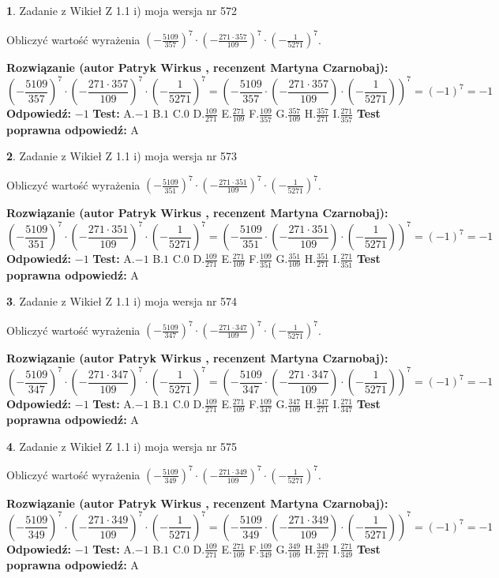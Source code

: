 \documentclass[12pt, a4paper]{article}
\theoremstyle{definition} %
\newtheorem{zad}{}
\newcommand{\zadStart}[1]{\begin{zad}#1\newline}
\newcommand{\zadStop}{\end{zad}}
\newcommand{\rozwStart}[2]{\noindent \textbf{Rozwiązanie (autor #1 , recenzent #2): }\newline}
\newcommand{\rozwStop}{\newline}
\newcommand{\odpStart}{\noindent \textbf{Odpowiedź:}\newline}
\newcommand{\odpStop}{\newline}
\newcommand{\testStart}{\noindent \textbf{Test:}\newline}
\newcommand{\testStop}{\newline}
\newcommand{\kluczStart}{\noindent \textbf{Test poprawna odpowiedź:}\newline}
\newcommand{\kluczStop}{\newline}
\begin{document}
\zadStart{Zadanie z Wikieł Z 1.1 i) moja wersja nr 572}

Obliczyć wartość wyrażenia $(-\frac{5109}{357})^{7} \cdot (-\frac{271 \cdot 357}{109})^{7} \cdot (-\frac{1}{5271})^{7}$.
\zadStop
\rozwStart{Patryk Wirkus}{Martyna Czarnobaj}
$$(-\frac{5109}{357})^{7} \cdot (-\frac{271 \cdot 357}{109})^{7} \cdot (-\frac{1}{5271})^{7} = (-\frac{5109}{357} \cdot (-\frac{271 \cdot 357}{109}) \cdot (-\frac{1}{5271}))^{7} = (-1)^{7} = -1$$
\rozwStop
\odpStart
$-1$
\odpStop
\testStart
A.$-1$ B.$1$ C.$0$ D.$\frac{109}{271}$ E.$\frac{271}{109}$
F.$\frac{109}{357}$ G.$\frac{357}{109}$
H.$\frac{357}{271}$
I.$\frac{271}{357}$
\testStop
\kluczStart
A
\kluczStop



\zadStart{Zadanie z Wikieł Z 1.1 i) moja wersja nr 573}

Obliczyć wartość wyrażenia $(-\frac{5109}{351})^{7} \cdot (-\frac{271 \cdot 351}{109})^{7} \cdot (-\frac{1}{5271})^{7}$.
\zadStop
\rozwStart{Patryk Wirkus}{Martyna Czarnobaj}
$$(-\frac{5109}{351})^{7} \cdot (-\frac{271 \cdot 351}{109})^{7} \cdot (-\frac{1}{5271})^{7} = (-\frac{5109}{351} \cdot (-\frac{271 \cdot 351}{109}) \cdot (-\frac{1}{5271}))^{7} = (-1)^{7} = -1$$
\rozwStop
\odpStart
$-1$
\odpStop
\testStart
A.$-1$ B.$1$ C.$0$ D.$\frac{109}{271}$ E.$\frac{271}{109}$
F.$\frac{109}{351}$ G.$\frac{351}{109}$
H.$\frac{351}{271}$
I.$\frac{271}{351}$
\testStop
\kluczStart
A
\kluczStop



\zadStart{Zadanie z Wikieł Z 1.1 i) moja wersja nr 574}

Obliczyć wartość wyrażenia $(-\frac{5109}{347})^{7} \cdot (-\frac{271 \cdot 347}{109})^{7} \cdot (-\frac{1}{5271})^{7}$.
\zadStop
\rozwStart{Patryk Wirkus}{Martyna Czarnobaj}
$$(-\frac{5109}{347})^{7} \cdot (-\frac{271 \cdot 347}{109})^{7} \cdot (-\frac{1}{5271})^{7} = (-\frac{5109}{347} \cdot (-\frac{271 \cdot 347}{109}) \cdot (-\frac{1}{5271}))^{7} = (-1)^{7} = -1$$
\rozwStop
\odpStart
$-1$
\odpStop
\testStart
A.$-1$ B.$1$ C.$0$ D.$\frac{109}{271}$ E.$\frac{271}{109}$
F.$\frac{109}{347}$ G.$\frac{347}{109}$
H.$\frac{347}{271}$
I.$\frac{271}{347}$
\testStop
\kluczStart
A
\kluczStop



\zadStart{Zadanie z Wikieł Z 1.1 i) moja wersja nr 575}

Obliczyć wartość wyrażenia $(-\frac{5109}{349})^{7} \cdot (-\frac{271 \cdot 349}{109})^{7} \cdot (-\frac{1}{5271})^{7}$.
\zadStop
\rozwStart{Patryk Wirkus}{Martyna Czarnobaj}
$$(-\frac{5109}{349})^{7} \cdot (-\frac{271 \cdot 349}{109})^{7} \cdot (-\frac{1}{5271})^{7} = (-\frac{5109}{349} \cdot (-\frac{271 \cdot 349}{109}) \cdot (-\frac{1}{5271}))^{7} = (-1)^{7} = -1$$
\rozwStop
\odpStart
$-1$
\odpStop
\testStart
A.$-1$ B.$1$ C.$0$ D.$\frac{109}{271}$ E.$\frac{271}{109}$
F.$\frac{109}{349}$ G.$\frac{349}{109}$
H.$\frac{349}{271}$
I.$\frac{271}{349}$
\testStop
\kluczStart
A
\kluczStop
\end{document}

